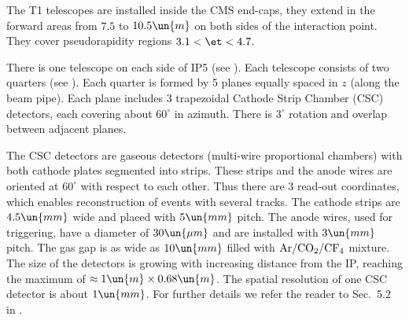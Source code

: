 

The T1 telescopes are installed inside the CMS end-caps, they extend in the forward areas from $7.5$ to $10.5\un{m}$ on both sides of the interaction point. They cover pseudorapidity regions $3.1 < \et < 4.7$.

There is one telescope on each side of IP5 (see ). Each telescope consists of two quarters (see ). Each quarter is formed by 5 planes equally spaced in $z$ (along the beam pipe). Each plane includes 3 trapezoidal Cathode Strip Chamber (CSC) detectors, each covering about $60^\circ$ in azimuth. There is $3^\circ$ rotation and overlap between adjacent planes.

\bmfig
{}
\emfig

The CSC detectors are gaseous detectors (multi-wire proportional chambers) with both cathode plates segmented into strips. These strips and the anode wires are oriented at $60^\circ$ with respect to each other. Thus there are 3 read-out coordinates, which enables reconstruction of events with several 
tracks. The cathode strips are $4.5\un{mm}$ wide and placed with $5\un{mm}$ pitch. The anode wires, used for triggering, have a diameter of $30\un{\mu m}$ and are installed with $3\un{mm}$ pitch. The gas gap is as wide as $10\un{mm}$ filled with $\rm Ar/CO_2/CF_4$ mixture. The size of the detectors is growing with increasing distance from the IP, reaching the maximum of $\approx 1\un{m} \times 0.68\un{m}$. The spatial resolution of one CSC detector is about $1\un{mm}$. For further details we refer the reader to Sec.~5.2 in .



